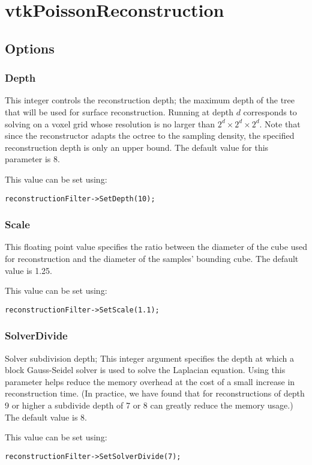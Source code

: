 \documentclass{InsightArticle}
\begin{document}
\section{vtkPoissonReconstruction}

\subsection{Options}
\subsubsection{Depth}
This integer controls the reconstruction depth; the maximum depth of the tree that will be used for surface reconstruction. Running at depth $d$ corresponds to solving on a voxel grid whose resolution is no larger than $2^d \times 2^d \times 2^d$. Note that since the reconstructor adapts the octree to the sampling density, the specified reconstruction depth is only an upper bound. The default value for this parameter is 8.

This value can be set using:
\begin{verbatim}
reconstructionFilter->SetDepth(10);
\end{verbatim}

\subsubsection{Scale}
This floating point value specifies the ratio between the diameter of the cube used for reconstruction and the diameter of the samples' bounding cube.
The default value is 1.25.

This value can be set using:
\begin{verbatim}
reconstructionFilter->SetScale(1.1); 
\end{verbatim}

\subsubsection{SolverDivide}
Solver subdivision depth; This integer argument specifies the depth at which a block Gauss-Seidel solver is used to solve the Laplacian equation. Using this parameter helps reduce the memory overhead at the cost of a small increase in reconstruction time. (In practice, we have found that for reconstructions of depth 9 or higher a subdivide depth of 7 or 8 can greatly reduce the memory usage.) The default value is 8.

This value can be set using:
\begin{verbatim}
reconstructionFilter->SetSolverDivide(7); 
\end{verbatim}
\end{document}

